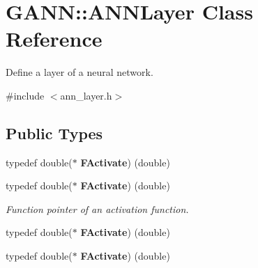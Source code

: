 \section{G\+A\+N\+N\+:\+:A\+N\+N\+Layer Class Reference}
\label{class_g_a_n_n_1_1_a_n_n_layer}


Define a layer of a neural network.  




{\ttfamily \#include $<$ann\+\_\+layer.\+h$>$}

\subsection*{Public Types}
\begin{DoxyCompactItemize}
\item 
typedef double($\ast$ {\bfseries F\+Activate}) (double)\label{class_g_a_n_n_1_1_a_n_n_layer_abb160533dd36e791bd0e561ef244cbae}

\item 
typedef double($\ast$ {\bf F\+Activate}) (double)\label{class_g_a_n_n_1_1_a_n_n_layer_abb160533dd36e791bd0e561ef244cbae}

\begin{DoxyCompactList}\small\item\em Function pointer of an activation function. \end{DoxyCompactList}\item 
typedef double($\ast$ {\bfseries F\+Activate}) (double)\label{class_g_a_n_n_1_1_a_n_n_layer_abb160533dd36e791bd0e561ef244cbae}

\item 
typedef double($\ast$ {\bfseries F\+Activate}) (double)\label{class_g_a_n_n_1_1_a_n_n_layer_abb160533dd36e791bd0e561ef244cbae}

\end{DoxyCompactItemize}
